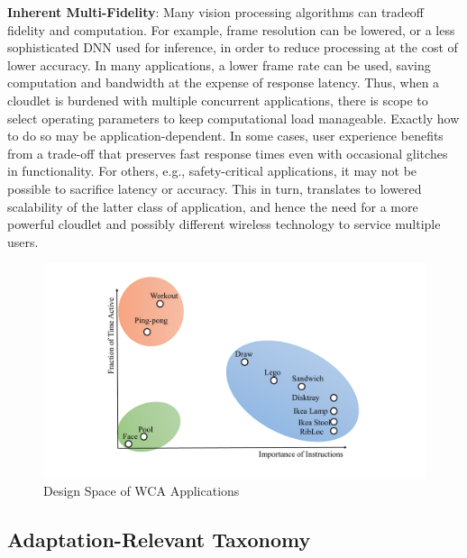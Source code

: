 \textbf{Inherent Multi-Fidelity}: Many vision processing algorithms
can tradeoff fidelity and computation.  For example, frame resolution
can be lowered, or a less sophisticated DNN used for inference, in
order to reduce processing at the cost of lower accuracy.  In many
applications, a lower frame rate can be used, saving computation and
bandwidth at the expense of response latency.  Thus, when a cloudlet
is burdened with multiple concurrent applications, there is scope to
select operating parameters to keep computational load manageable.
Exactly how to do so may be application-dependent.  In some cases,
user experience benefits from a trade-off that preserves fast response
times even with occasional glitches in functionality.  For others,
e.g., safety-critical applications, it may not be possible to
sacrifice latency or accuracy.  This in turn, translates to lowered
scalability of the latter class of application, and hence the need for
a more powerful cloudlet and possibly different wireless technology to
service multiple users.

\begin{figure}[h]
    \centering
    \includegraphics[width=\linewidth, trim=10em 2em 6em 2em, clip]{FIGS/fig-design-space.pdf}
    \caption{Design Space of WCA Applications}
    \label{figs:design-space}
\end{figure}
\subsection{Adaptation-Relevant Taxonomy}

\label{sec:taxonomy}

